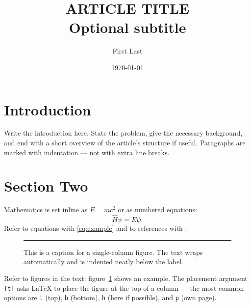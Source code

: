 \documentclass[a4paper,10pt,twocolumn]{article}
\title{ARTICLE TITLE\\[0.4em]
{\large Optional subtitle}}
\author{First Last}
\date{\today}
\begin{document}

\section{Introduction}

Write the introduction here. State the problem, give the necessary background, and end with a short overview of the article's structure if useful. Paragraphs are marked with indentation --- not with extra line breaks.

\section{Section Two}

Mathematics is set inline as $E = mc^2$ or as numbered equations:
\begin{equation}
  \hat{H}\psi = E\psi.
  \label{eq:example}
\end{equation}
Refer to equations with \eqref{eq:example} and to references with \cite{example2024}.

\begin{figure}[t]
  \centering
  \rule{0.9\linewidth}{3cm}     %
  \caption{This is a caption for a single-column figure.
           The text wraps automatically and is indented neatly below the label.}
  \label{fig:simple}
\end{figure}

Refer to figures in the text: figure~\ref{fig:simple} shows an example. The placement argument \texttt{[t]} asks LaTeX to place the figure at the top of a column --- the most common options are \texttt{t} (top), \texttt{b} (bottom), \texttt{h} (here if possible), and \texttt{p} (own page).
\end{document}
